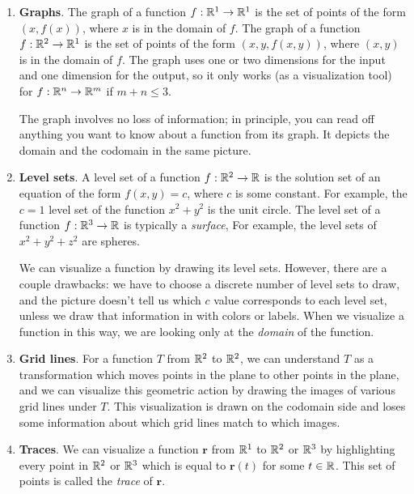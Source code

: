 \documentclass[prettycode,shellescape]{watsonbook}
\begin{document}
\begin{tcolorbox}[title = Function Visualization Methods, colback =
  softblue, colframe = MidnightBlue] 
  \begin{enumerate}[leftmargin = 12pt, itemsep = 6pt, parsep = 6pt]
  \item \textbf{Graphs}. The graph of a function $f : \mathbb{R}^1 \to \mathbb{R}^1$ is
    the set of points of the form $(x,f(x))$, where $x$ is in the
    domain of $f$. The graph of a function $f : \mathbb{R}^2 \to \mathbb{R}^1$ is
    the set of points of the form $(x,y,f(x,y))$, where $(x,y)$ is in the
    domain of $f$. The graph uses one or two dimensions for the input
    and one dimension for the output, so it only works (as a
    visualization tool) for $f : \mathbb{R}^n \to \mathbb{R}^m$ if $m + n \leq 3$.

    The graph involves no loss of information; in principle, you can
    read off anything you want to know about a function from its
    graph. It depicts the domain and the codomain in the same picture. 
    
  \item \textbf{Level sets}. A level set of a function $f:\mathbb{R}^2 \to \mathbb{R}$
    is the solution set of an equation of the form $f(x,y) = c$, where
    $c$ is some constant. For example, the $c=1$ level set of the
    function $x^2 + y^2$ is the unit circle. The level set of a
    function $f:\mathbb{R}^3 \to \mathbb{R}$ is typically a \textit{surface}, For
    example, the level sets of $x^2 + y^2 + z^2$ are spheres.

    We can visualize a function by drawing its level sets. However,
    there are a couple drawbacks: we have to choose a discrete number
    of level sets to draw, and the picture doesn't tell us which $c$
    value corresponds to each level set, unless we draw that
    information in with colors or labels. When we visualize a function
    in this way, we are looking only at the \textit{domain} of the
    function. 

  \item \textbf{Grid lines}. For a function $T$ from $\mathbb{R}^2$ to $\mathbb{R}^2$, we can
    understand $T$ as a transformation which moves points in the plane
    to other points in the plane, and we can visualize this geometric
    action by drawing the images of various grid lines under $T$. This
    visualization is drawn on the codomain side and loses some
    information about which grid lines match to which images. 
    
  \item \textbf{Traces}. We can visualize a function $\mathbf{r}$ from
    $\mathbb{R}^1$ to $\mathbb{R}^2$ or $\mathbb{R}^3$ by highlighting every point in $\mathbb{R}^2$
    or $\mathbb{R}^3$ which is equal to $\mathbf{r}(t)$ for some $t\in
    \mathbb{R}$. This set of points is called the \textit{trace} of
    $\mathbf{r}$.


\end{enumerate}
\end{tcolorbox}
\end{document}

